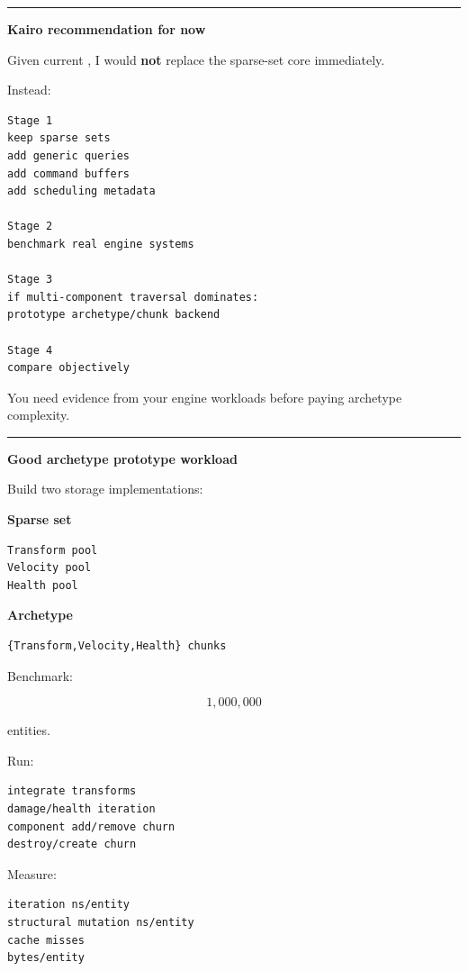 \begin{center}\rule{0.5\linewidth}{0.5pt}\end{center}

\textbf{Kairo recommendation for now}

Given current , I would \textbf{not} replace the sparse-set core immediately.

Instead:

\begin{verbatim}
Stage 1
keep sparse sets
add generic queries
add command buffers
add scheduling metadata

Stage 2
benchmark real engine systems

Stage 3
if multi-component traversal dominates:
prototype archetype/chunk backend

Stage 4
compare objectively
\end{verbatim}

You need evidence from your engine workloads before paying archetype complexity.

\begin{center}\rule{0.5\linewidth}{0.5pt}\end{center}

\textbf{Good archetype prototype workload}

Build two storage implementations:

\textbf{Sparse set}

\begin{verbatim}
Transform pool
Velocity pool
Health pool
\end{verbatim}

\textbf{Archetype}

\begin{verbatim}
{Transform,Velocity,Health} chunks
\end{verbatim}

Benchmark:

\[
1,000,000
\]

entities.

Run:

\begin{verbatim}
integrate transforms
damage/health iteration
component add/remove churn
destroy/create churn
\end{verbatim}

Measure:

\begin{verbatim}
iteration ns/entity
structural mutation ns/entity
cache misses
bytes/entity
\end{verbatim}

